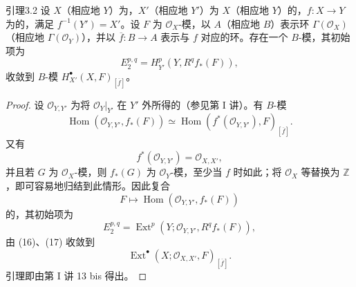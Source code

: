 \begin{SGAresult}{引理}{3.2}
设 $X$（相应地 $Y$）为，$X'$（相应地 $Y'$）为 $X$（相应地 $Y$）的，$f:X\to Y$ 为的，满足 $f^{-1}(Y')=X'$。设 $F$ 为 $\mathcal O_X$-模，以 $A$（相应地 $B$）表示环 $\Gamma(\mathcal O_X)$（相应地 $\Gamma(\mathcal O_Y)$），并以 $\overline f:B\to A$ 表示与 $f$ 对应的环。存在一个 $B$-模，其初始项为
\[E_2^{p,q}=H^p_{Y'}(Y,R^qf_*(F)),\tag{15}\]
收敛到 $B$-模 $H^{\bullet}_{X'}(X,F)_{[\overline f]}$。
\end{SGAresult}
\begin{proof}
设 $\mathcal O_{Y,Y'}$ 为将 $\mathcal O_Y|_{Y'}$ 在 $Y'$ 外所得的（参见第 I 讲）。有 $B$-模
\[\operatorname{Hom}(\mathcal O_{Y,Y'},f_*(F))\simeq\operatorname{Hom}(f^*(\mathcal O_{Y,Y'}),F)_{[\overline f]}.\tag{16}\]
又有
\[f^*(\mathcal O_{Y,Y'})=\mathcal O_{X,X'},\tag{17}\]
并且若 $G$ 为 $\mathcal O_X$-模，则 $f_*(G)$ 为 $\mathcal O_Y$-模，至少当 $f$ 时如此；将 $\mathcal O_X$ 等替换为 $\mathbb Z$，即可容易地归结到此情形。因此复合
\[F\longmapsto\operatorname{Hom}(\mathcal O_{Y,Y'},f_*(F))\]
的，其初始项为
\[E_2^{p,q}=\operatorname{Ext}^p(Y;\mathcal O_{Y,Y'},R^qf_*(F)),\]
由 (16)、(17) 收敛到
\[\operatorname{Ext}^{\bullet}(X;\mathcal O_{X,X'},F)_{[\overline f]}.\]
引理即由第 I 讲 13 bis 得出。
\end{proof}
